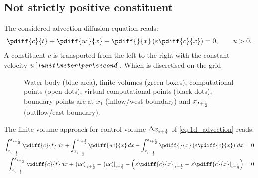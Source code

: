 \subsection{Not strictly positive constituent}\label{sec:1d_adv_diff_equation}
The considered advection-diffusion equation reads:
\begin{align}
    \pdiff{c}{t} + \pdiff{uc}{x} - \pdiff{}{x}\left( \eps \pdiff{c}{x}\right)= 0, \qquad u>0. \label{eq:1d_advection}
\end{align}
A constituent $c$ is transported from the left to the right with the constant  velocity $u\, \bunit{\meter\per\second}$.
Which is discretised on the grid
\begin{figure}[H]
    \centering
    \begin{center}
        \resizebox{0.8\textwidth}{!}{
            
        }
    \end{center}
    \caption[Definition of the grid to solve the 1D-advection equation]
    {Water body (blue area), finite volumes (green boxes), computational points (open dots), virtual computational points (black dots), 
    boundary points are at $x_{1}$ (inflow/west boundary) and $x_{I+\frac{1}{2}}$ (outflow/east boundary).}\label{fig:water_body_fve_bc_at_node_1}
\end{figure}
The finite volume approach for control volume $\Delta x_{i+\frac{1}{2}}$ of \autoref{eq:1d_advection} reads:
\begin{align}
    \int^{x_{i+\half}}_{x_{i-\half}} \pdiff{c}{t}\, dx
    + \int^{x_{i+\half}}_{x_{i-\half}} \pdiff{uc}{x} \, dx
    - \int^{x_{i+\half}}_{x_{i-\half}} \pdiff{}{x}\left( \eps\pdiff{c}{x} \right)\, dx &= 0
    \\
    \int^{x_{i+\half}}_{x_{i-\half}} \pdiff{c}{t}\, dx + \left. (uc) \right|_{i+\half} -  \left. (uc) \right|_{i-\half}
    -  \left(
    \left. \eps\pdiff{c}{x}\right|_{i+\half} -
    \left. \eps\pdiff{c}{x}\right|_{i-\half}
     \right) & = 0
\end{align}

